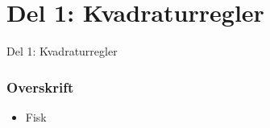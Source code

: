 \section{Del 1: Kvadraturregler}
\begin{frame}
\centering
\Huge
Del 1: Kvadraturregler
\end{frame}
%
\begin{frame}
\frametitle{Overskrift}
\begin{itemize}
\item Fisk
\end{itemize}
\end{frame}
